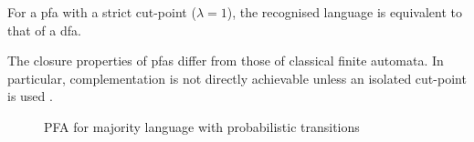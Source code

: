 \begin{corollary}
For a \gls{pfa} with a strict cut-point (\(\lambda = 1\)), the recognised language is equivalent to that of a \gls{dfa}.
\end{corollary}

\begin{observation}
    The closure properties of \glspl{pfa} differ from those of classical finite automata. In particular, complementation is not directly achievable unless an isolated cut-point is used \cite{droste2009handbook}.
\end{observation}

\begin{figure}[h]
    \centering  
    \caption{PFA for majority language with probabilistic transitions}
    \label{fig:pfa-example}
\end{figure}
